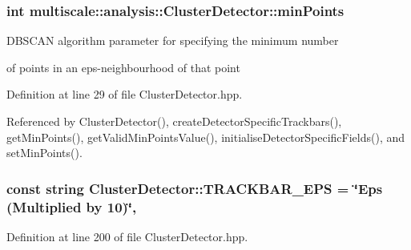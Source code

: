 \hypertarget{classmultiscale_1_1analysis_1_1ClusterDetector_aa94df1adc462be5931ec25ba24122fe9}{
\subsubsection[{min\-Points}]{\setlength{\rightskip}{0pt plus 5cm}int multiscale\-::analysis\-::\-Cluster\-Detector\-::min\-Points\hspace{0.3cm}{\ttfamily [protected]}}}\label{classmultiscale_1_1analysis_1_1ClusterDetector_aa94df1adc462be5931ec25ba24122fe9}
\begin{DoxyVerb}                  DBSCAN algorithm parameter for specifying the minimum number
\end{DoxyVerb}
 of points in an eps-\/neighbourhood of that point 

Definition at line 29 of file Cluster\-Detector.\-hpp.



Referenced by Cluster\-Detector(), create\-Detector\-Specific\-Trackbars(), get\-Min\-Points(), get\-Valid\-Min\-Points\-Value(), initialise\-Detector\-Specific\-Fields(), and set\-Min\-Points().

\hypertarget{classmultiscale_1_1analysis_1_1ClusterDetector_a656f64f88c73c25824e5a4416a742aaf}{
\subsubsection[{T\-R\-A\-C\-K\-B\-A\-R\-\_\-\-E\-P\-S}]{\setlength{\rightskip}{0pt plus 5cm}const string Cluster\-Detector\-::\-T\-R\-A\-C\-K\-B\-A\-R\-\_\-\-E\-P\-S = \char`\"{}Eps (Multiplied by 10)\char`\"{}\hspace{0.3cm}{\ttfamily [static]}, {\ttfamily [private]}}}\label{classmultiscale_1_1analysis_1_1ClusterDetector_a656f64f88c73c25824e5a4416a742aaf}


Definition at line 200 of file Cluster\-Detector.\-hpp.



